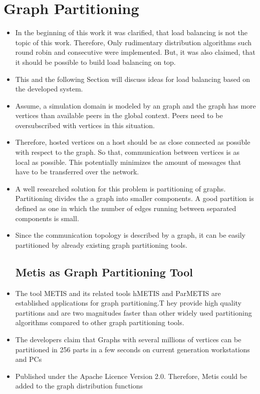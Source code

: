 \section*{Graph Partitioning}
\begin{itemize}

\item In the beginning of this work it was clarified, that load
  balancing is not the topic of this work. Therefore, Only rudimentary
  distribution algorithms such round robin and consecutive were
  implemented. But, it was also claimed, that it should be possible to
  build load balancing on top.

\item This and the following Section will discuss ideas for load
  balancing based on the developed system.

\item Assume, a simulation domain is modeled by an graph and the graph
  has more vertices than available peers in the global context. Peers
  need to be oversubscribed with vertices in this situation.

\item Therefore, hosted vertices on a host should be as close
  connected as possible with respect to the graph. So that,
  communication between vertices is as local as possible. This
  potentially minimizes the amount of messages that have to be
  transferred over the network.

\item A well researched solution for this problem is partitioning of
  graphs. Partitioning divides the a graph into smaller components.
  A good partition is defined as one in which the number of edges
  running between separated components is small.

\item Since the communication topology is described by a graph, it can
  be easily partitioned by already existing graph partitioning tools.

  \subsection{Metis as Graph Partitioning Tool}
\item The tool METIS and its related tools hMETIS and ParMETIS are
  established applications for graph partitioning.T hey provide high
  quality partitions and are two magnitudes faster than other widely
  used partitioning algorithms compared to other graph partitioning
  tools.

\item The developers claim that Graphs with several millions of
  vertices can be partitioned in 256 parts in a few seconds on current
  generation workstations and PCs

\item Published under the Apache Licence Version 2.0. Therefore, Metis
  could be added to the graph distribution functions

  
\end{itemize}

